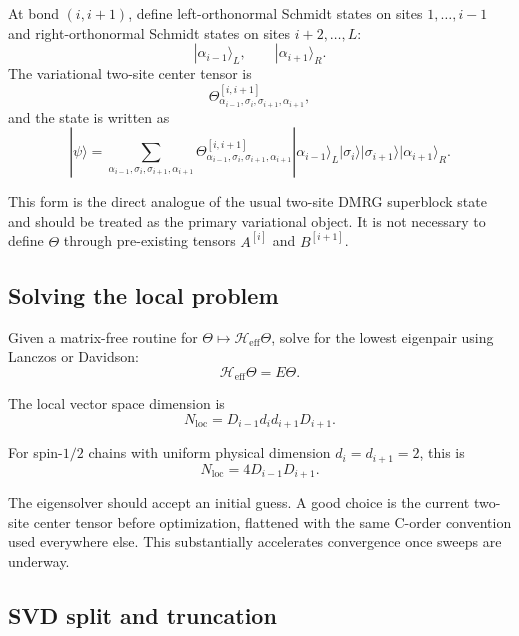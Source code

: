 \documentclass[aps,prb,onecolumn,nofootinbib]{revtex4-2}
\newcommand{\ket}[1]{|#1\rangle}
\begin{document}
	At bond $(i,i+1)$, define left-orthonormal Schmidt states on sites $1,\dots,i-1$ and right-orthonormal Schmidt states on sites $i+2,\dots,L$:
	\[
	\ket{\alpha_{i-1}}_L,\qquad \ket{\alpha_{i+1}}_R.
	\]
	The variational two-site center tensor is
	\begin{equation}
		\Theta^{[i,i+1]}_{\alpha_{i-1},\sigma_i,\sigma_{i+1},\alpha_{i+1}},
		\label{eq:theta-def-alg}
	\end{equation}
	and the state is written as
	\begin{equation}
		\ket{\psi}
		=
		\sum_{\alpha_{i-1},\sigma_i,\sigma_{i+1},\alpha_{i+1}}
		\Theta^{[i,i+1]}_{\alpha_{i-1},\sigma_i,\sigma_{i+1},\alpha_{i+1}}
		\ket{\alpha_{i-1}}_L \ket{\sigma_i}\ket{\sigma_{i+1}} \ket{\alpha_{i+1}}_R.
		\label{eq:two-site-state-alg}
	\end{equation}
	
	This form is the direct analogue of the usual two-site DMRG superblock state and should be treated as the primary variational object. It is not necessary to define $\Theta$ through pre-existing tensors $A^{[i]}$ and $B^{[i+1]}$.
	
	\subsection{Solving the local problem}
	
	Given a matrix-free routine for $\Theta \mapsto \mathcal{H}_{\mathrm{eff}}\Theta$, solve for the lowest eigenpair using Lanczos or Davidson:
	\begin{equation}
		\mathcal{H}_{\mathrm{eff}} \Theta = E \Theta.
	\end{equation}
	
	The local vector space dimension is
	\begin{equation}
		N_{\mathrm{loc}} = D_{i-1} d_i d_{i+1} D_{i+1}.
	\end{equation}
	
	For spin-$1/2$ chains with uniform physical dimension $d_i=d_{i+1}=2$, this is
	\[
	N_{\mathrm{loc}} = 4 D_{i-1} D_{i+1}.
	\]
	
	The eigensolver should accept an initial guess. A good choice is the current two-site center tensor before optimization, flattened with the same C-order convention used everywhere else. This substantially accelerates convergence once sweeps are underway.
	
	\subsection{SVD split and truncation}
	
\end{document}
